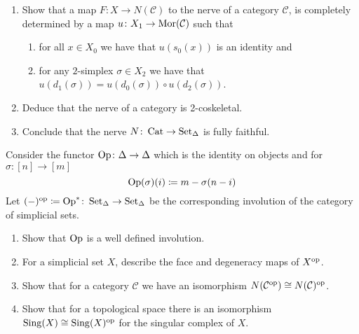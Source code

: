 \begin{Exercise}
    \begin{enumerate}[label=(\alph*)]
         \item 
         Show that a map $ F \colon X  \to N ( \mathcal{ C } ) $ to the nerve of a category $ \mathcal{ C } $, is completely determined by a map $ u \colon X_1 \to \operatorname{Mor} ( \mathcal{ C } ) $ such that 
         \begin{enumerate}
             \item 
             for all $ x \in X_0 $ we have that $ u ( s_0 ( x ) ) $ is an identity and 
    
             \item 
             for any $2$-simplex $ \sigma \in X_2 $ we have that $ u ( d_1 ( \sigma ) ) = u ( d_0 ( \sigma ) ) \circ u ( d_2 ( \sigma ) )$.
         \end{enumerate}
    
         \item 
         Deduce that the nerve of a category is 2-coskeletal.
    
         \item 
         Conclude that the nerve $ N \colon \operatorname{Cat} \to \operatorname{Set}_{\Delta} $ is fully faithful.
    \end{enumerate}
\end{Exercise}

\begin{Exercise}
    Consider the functor $ \operatorname{Op} \colon \Delta \to \Delta $ which is the identity on objects and for $ \sigma : [ n ] \to [ m ] $
    \[
        \operatorname{Op} ( \sigma ) ( i ) 
        \coloneqq
        m - \sigma ( n - i )
    \]
    Let $ ( - )^{ \operatorname{op} } \coloneqq \operatorname{Op}^* \colon \operatorname{Set}_{\Delta} \to \operatorname{Set}_{\Delta} $ be the corresponding involution of the category of simplicial sets.
    
    \begin{enumerate}[label=(\alph*)]
        \item 
        Show that $ \operatorname{Op} $ is a well defined involution.
    
        \item 
        For a simplicial set $ X $, describe the face and degeneracy maps of $ X ^{ \operatorname{op} } $.
    
        \item 
        Show that for a category $ \mathcal{ C } $ we have an isomorphism $ N ( \mathcal{ C }^{\operatorname{op}} ) \cong N ( \mathcal{ C } )^{\operatorname{op}} $.
    
        \item   
        Show that for a topological space there is an isomorphism $ \operatorname{Sing} ( X ) \cong \operatorname{Sing} ( X )^{ \operatorname{op} } $ for the singular complex of $ X $.
    \end{enumerate}
\end{Exercise}